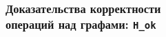 \documentclass[14pt]{beamer}
\begin{document}
\begin{frame}[fragile]
\frametitle{Доказательства корректности \\ операций над графами: {\tt H\_ok}}

\begin{figure}[h]
  \begin{minipage}[h]{1\linewidth}
  \end{minipage}
  \begin{minipage}[h]{1\linewidth}
  \end{minipage}
\end{figure}
\end{frame}
\end{document}
